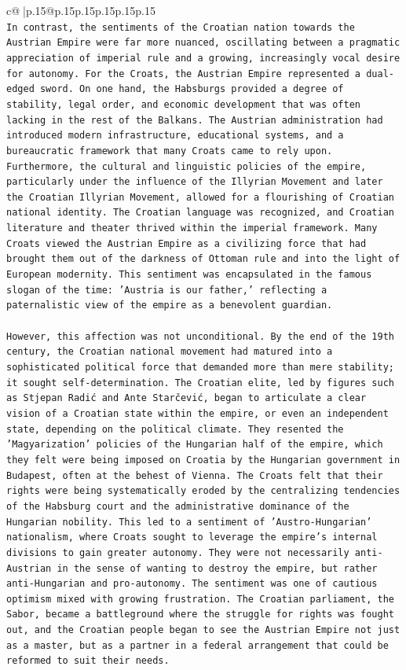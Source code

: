 \documentclass{article}
\begin{document}
{\begin{supertabular}{c@{$\;$}|p{.15\linewidth}@{}p{.15\linewidth}p{.15\linewidth}p{.15\linewidth}p{.15\linewidth}p{.15\linewidth}}
{{{\\ 
\texttt{In contrast, the sentiments of the Croatian nation towards the Austrian Empire were far more nuanced, oscillating between a pragmatic appreciation of imperial rule and a growing, increasingly vocal desire for autonomy. For the Croats, the Austrian Empire represented a dual{-}edged sword. On one hand, the Habsburgs provided a degree of stability, legal order, and economic development that was often lacking in the rest of the Balkans. The Austrian administration had introduced modern infrastructure, educational systems, and a bureaucratic framework that many Croats came to rely upon. Furthermore, the cultural and linguistic policies of the empire, particularly under the influence of the Illyrian Movement and later the Croatian Illyrian Movement, allowed for a flourishing of Croatian national identity. The Croatian language was recognized, and Croatian literature and theater thrived within the imperial framework. Many Croats viewed the Austrian Empire as a civilizing force that had brought them out of the darkness of Ottoman rule and into the light of European modernity. This sentiment was encapsulated in the famous slogan of the time: 'Austria is our father,' reflecting a paternalistic view of the empire as a benevolent guardian.} \\
\\ 
\texttt{However, this affection was not unconditional. By the end of the 19th century, the Croatian national movement had matured into a sophisticated political force that demanded more than mere stability; it sought self{-}determination. The Croatian elite, led by figures such as Stjepan Radić and Ante Starčević, began to articulate a clear vision of a Croatian state within the empire, or even an independent state, depending on the political climate. They resented the 'Magyarization' policies of the Hungarian half of the empire, which they felt were being imposed on Croatia by the Hungarian government in Budapest, often at the behest of Vienna. The Croats felt that their rights were being systematically eroded by the centralizing tendencies of the Habsburg court and the administrative dominance of the Hungarian nobility. This led to a sentiment of 'Austro{-}Hungarian' nationalism, where Croats sought to leverage the empire's internal divisions to gain greater autonomy. They were not necessarily anti{-}Austrian in the sense of wanting to destroy the empire, but rather anti{-}Hungarian and pro{-}autonomy. The sentiment was one of cautious optimism mixed with growing frustration. The Croatian parliament, the Sabor, became a battleground where the struggle for rights was fought out, and the Croatian people began to see the Austrian Empire not just as a master, but as a partner in a federal arrangement that could be reformed to suit their needs.} \\
}}}
\end{supertabular}}
\end{document}
